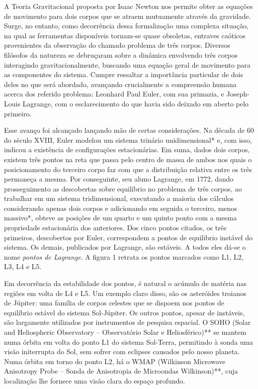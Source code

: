 A Teoria Gravitacional proposta por Isaac Newton nos permite obter as equações de movimento para  dois corpos que se atraem mutuamente através da gravidade. Surge, no entanto, como decorrência dessa formalização uma complexa situação, na qual as ferramentas disponíveis tornam-se quase obsoletas, entraves caóticos provenientes da observação do chamado problema de três corpos. Diversos filósofos da natureza se debruçaram sobre a dinâmica envolvendo três corpos interagindo gravitacionalmente, buscando uma equação geral de movimento para as componentes do sistema. Cumpre ressaltar a importância particular de dois deles no que será abordado, avançando crucialmente a compreensão humana acerca dos referido problema: Leonhard Paul Euler, com sua primazia, e Joseph-Louis Lagrange, com o esclarecimento do que havia sido deixado em aberto pelo primeiro.
   
   Esse avanço foi alcançado lançando mão de certas considerações. Na década de 60 do século XVIII, Euler modelou um sistema trinário unidimensional* e, com isso, indicou a existência de configurações estacionárias. Em suma, dados dois corpos, existem três pontos na reta que passa pelo centro de massa de ambos nos quais o posicionamento do terceiro corpo faz com que a distribuição relativa entre os três permaneça a mesma. Por conseguinte, seu aluno Lagrange, em 1772, dando prosseguimento as descobertas sobre equilíbrio no problema de três corpos, ao trabalhar em um sistema tridimensional, executando a maioria dos cálculos considerando apenas dois corpos e adicionando em seguida o terceiro, menos massivo*, obteve as posições de um quarto e um quinto ponto com a mesma propriedade estacionária dos anteriores. Dos cinco pontos citados, os três primeiros, descobertos por Euler, correspondem a pontos de equilibrio instável do sistema. Os demais, publicados por Lagrange, são estáveis. A todos eles dá-se o nome \textit{pontos de Lagrange}. A figura 1 retrata os pontos marcados como L1, L2, L3, L4 e L5.
   
Em decorrência da estabilidade dos pontos, é natural o acúmulo de matéria nas regiões em volta de L4 e L5. Um exemplo claro disso, são os asteróides troianos de Júpiter: uma família de corpos celestes que se dispoem nos pontos de equilíbrio estável do sistema Sol-Júpiter. Os outros pontos, apesar de instáveis, são largamente utilizados por instrumentos de pesquisa espacial. O SOHO (Solar and Heliospheric Observatory -- Observatório Solar e Heliosférico)** se mantem numa órbita em volta do ponto L1 do sistema Sol-Terra, permitindo à sonda uma visão initerrupta do Sol, sem sofrer com eclipses causados pelo nosso planeta. Numa órbita em torno do ponto L2, há o WMAP (Wilkinson Microwave Anisotropy Probe -- Sonda de Anisotropia de Microondas Wilkinson)**, cuja localização lhe fornece uma visão clara do espaço profundo.
